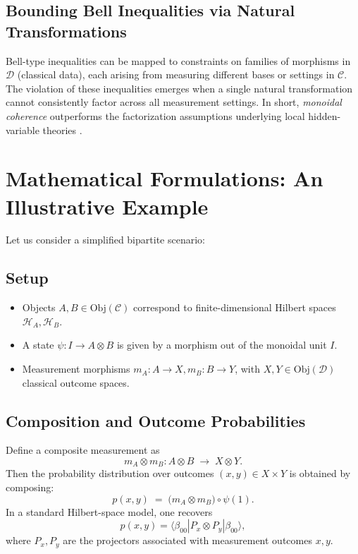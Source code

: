 \documentclass[12pt]{article}
\begin{document}
\subsection{Bounding Bell Inequalities via Natural Transformations}

Bell-type inequalities can be mapped to constraints on families of morphisms in $\mathcal{D}$ (classical data), each arising from measuring different bases or settings in $\mathcal{C}$. The violation of these inequalities emerges when a single natural transformation cannot consistently factor across all measurement settings. In short, \emph{monoidal coherence} outperforms the factorization assumptions underlying local hidden-variable theories \cite{AbramskyCoecke}.

\vspace{1em}

\section{Mathematical Formulations: An Illustrative Example}
\label{sec:formulations}

Let us consider a simplified bipartite scenario:

\subsection{Setup}
\begin{itemize}
    \item Objects $A,B \in \mathrm{Obj}(\mathcal{C})$ correspond to finite-dimensional Hilbert spaces $\mathcal{H}_A, \mathcal{H}_B$.
    \item A state $\psi: I \to A \otimes B$ is given by a morphism out of the monoidal unit $I$.
    \item Measurement morphisms $m_A: A \to X, m_B: B \to Y$, with $X,Y \in \mathrm{Obj}(\mathcal{D})$ classical outcome spaces.
\end{itemize}

\subsection{Composition and Outcome Probabilities}
Define a composite measurement as
\begin{equation}
m_A \otimes m_B: A \otimes B \;\longrightarrow\; X \otimes Y.
\end{equation}
Then the probability distribution over outcomes $(x,y) \in X \times Y$ is obtained by composing:
\begin{equation}
p(x,y) \;=\; 
\bigl(m_A \otimes m_B\bigr)\circ \psi (1).
\end{equation}
In a standard Hilbert-space model, one recovers
\[
p(x,y) = \langle \beta_{00} | P_x \otimes P_y | \beta_{00}\rangle,
\]
where $P_x, P_y$ are the projectors associated with measurement outcomes $x,y$.
\end{document}
